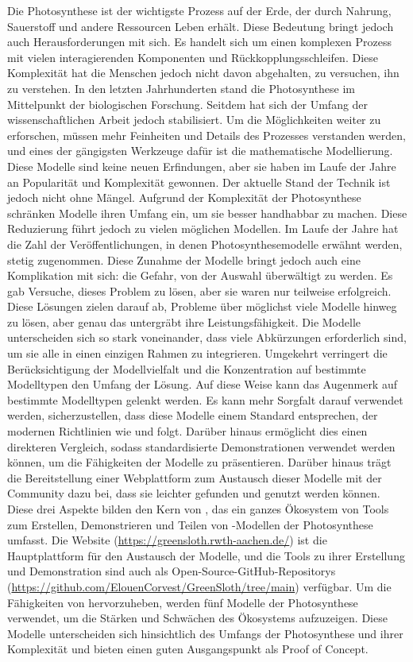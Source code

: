 Die Photosynthese ist der wichtigste Prozess auf der Erde, der durch Nahrung, Sauerstoff und andere Ressourcen Leben erhält. Diese Bedeutung bringt jedoch auch Herausforderungen mit sich. Es handelt sich um einen komplexen Prozess mit vielen interagierenden Komponenten und Rückkopplungsschleifen. Diese Komplexität hat die Menschen jedoch nicht davon abgehalten, zu versuchen, ihn zu verstehen. In den letzten Jahrhunderten stand die Photosynthese im Mittelpunkt der biologischen Forschung. Seitdem hat sich der Umfang der wissenschaftlichen Arbeit jedoch stabilisiert. Um die Möglichkeiten weiter zu erforschen, müssen mehr Feinheiten und Details des Prozesses verstanden werden, und eines der gängigsten Werkzeuge dafür ist die mathematische Modellierung. Diese Modelle sind keine neuen Erfindungen, aber sie haben im Laufe der Jahre an Popularität und Komplexität gewonnen. Der aktuelle Stand der Technik ist jedoch nicht ohne Mängel. Aufgrund der Komplexität der Photosynthese schränken Modelle ihren Umfang ein, um sie besser handhabbar zu machen. Diese Reduzierung führt jedoch zu vielen möglichen Modellen. Im Laufe der Jahre hat die Zahl der Veröffentlichungen, in denen Photosynthesemodelle erwähnt werden, stetig zugenommen. Diese Zunahme der Modelle bringt jedoch auch eine Komplikation mit sich: die Gefahr, von der Auswahl überwältigt zu werden. Es gab Versuche, dieses Problem zu lösen, aber sie waren nur teilweise erfolgreich. Diese Lösungen zielen darauf ab, Probleme über möglichst viele Modelle hinweg zu lösen, aber genau das untergräbt ihre Leistungsfähigkeit. Die Modelle unterscheiden sich so stark voneinander, dass viele Abkürzungen erforderlich sind, um sie alle in einen einzigen Rahmen zu integrieren. Umgekehrt verringert die Berücksichtigung der Modellvielfalt und die Konzentration auf bestimmte Modelltypen den Umfang der Lösung. Auf diese Weise kann das Augenmerk auf bestimmte Modelltypen gelenkt werden. Es kann mehr Sorgfalt darauf verwendet werden, sicherzustellen, dass diese Modelle einem Standard entsprechen, der modernen Richtlinien wie  und  folgt. Darüber hinaus ermöglicht dies einen direkteren Vergleich, sodass standardisierte Demonstrationen verwendet werden können, um die Fähigkeiten der Modelle zu präsentieren. Darüber hinaus trägt die Bereitstellung einer Webplattform zum Austausch dieser Modelle mit der Community dazu bei, dass sie leichter gefunden und genutzt werden können. Diese drei Aspekte bilden den Kern von \greensloth{}, das ein ganzes Ökosystem von Tools zum Erstellen, Demonstrieren und Teilen von -Modellen der Photosynthese umfasst. Die Website (\url{https://greensloth.rwth-aachen.de/}) ist die Hauptplattform für den Austausch der Modelle, und die Tools zu ihrer Erstellung und Demonstration sind auch als Open-Source-GitHub-Repositorys (\url{https://github.com/ElouenCorvest/GreenSloth/tree/main}) verfügbar. Um die Fähigkeiten von \greensloth{} hervorzuheben, werden fünf Modelle der Photosynthese verwendet, um die Stärken und Schwächen des Ökosystems aufzuzeigen. Diese Modelle unterscheiden sich hinsichtlich des Umfangs der Photosynthese und ihrer Komplexität und bieten einen guten Ausgangspunkt als Proof of Concept.